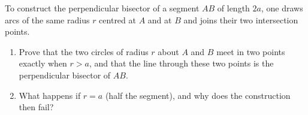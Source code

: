 To construct the perpendicular bisector of a segment $AB$ of length $2a$, one draws arcs of the same radius $r$ centred at $A$ and at $B$ and joins their two intersection points.
\begin{enumerate}
\item[(a)] Prove that the two circles of radius $r$ about $A$ and $B$ meet in two points exactly when $r>a$, and that the line through these two points is the perpendicular bisector of $AB$.
\item[(b)] What happens if $r=a$ (half the segment), and why does the construction then fail?
\end{enumerate}
